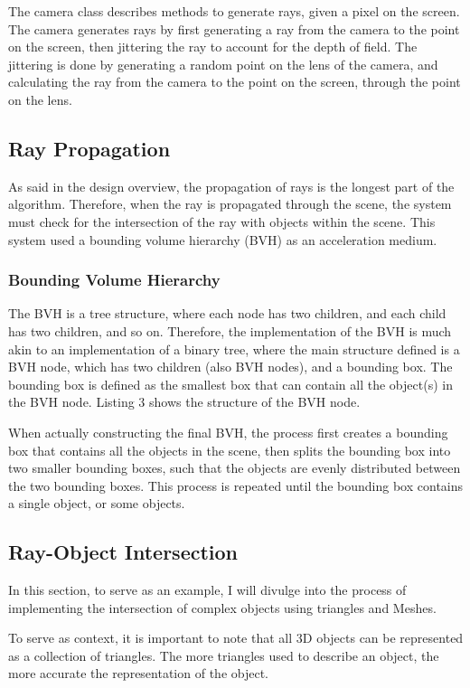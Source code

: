 \documentclass[../main.tex]{subfiles}
\begin{document}
The camera class describes methods to generate rays, given a pixel on the screen. 
The camera generates rays by first generating a ray from the camera to the point on the screen, then jittering the ray
to account for the depth of field. The jittering is done by generating a random point on the lens of the camera, and
calculating the ray from the camera to the point on the screen, through the point on the lens. 

\subsection{Ray Propagation}
As said in the design overview, the propagation of rays is the longest part of the algorithm. 
Therefore, when the ray is propagated through the scene, the system must check for the
intersection of the ray with objects within the scene. This system used a bounding volume hierarchy (BVH)
as an acceleration medium.
\subsubsection{Bounding Volume Hierarchy}
The BVH is a tree structure, where each node has two children, and each child has two children, and so on. 
Therefore, the implementation of the BVH is much akin to an implementation of a binary tree, where the main structure
defined is a BVH node, which has two children (also BVH nodes), and a bounding box. The bounding box 
is defined as the smallest box that can contain all the object(s) in the BVH node. Listing 3 shows the structure of the BVH node.

When actually constructing the final BVH, the process first creates a bounding box that contains all the objects in the scene, then
splits the bounding box into two smaller bounding boxes, such that the objects are evenly distributed between the two
bounding boxes. This process is repeated until the bounding box contains a single object, or some objects.

\subsection{Ray-Object Intersection}
In this section, to serve as an example, I will divulge into the process of implementing the intersection of complex objects using triangles and 
Meshes.

To serve as context, it is important to note that all 3D objects can be represented as a collection of triangles. The more 
triangles used to describe an object, the more accurate the representation of the object.
\end{document}
